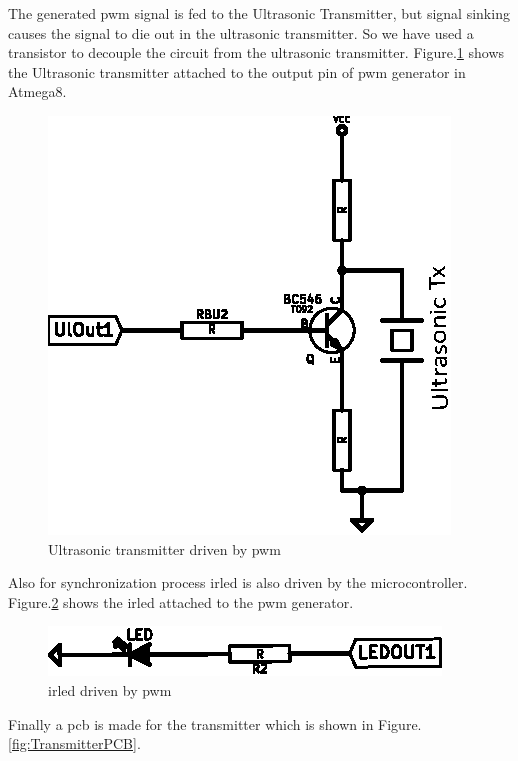 The generated \gls{pwm} signal is fed to the Ultrasonic Transmitter, but signal sinking causes the signal to die out in the ultrasonic transmitter. So we have used a transistor to decouple the circuit from the ultrasonic transmitter. Figure.\ref{fig:Transmitter} shows the Ultrasonic transmitter attached to the output pin of \gls{pwm} generator in Atmega8.
\begin{figure}
	\centering
	\includegraphics{Images/Transmitter.eps}
	\caption{Ultrasonic transmitter driven by \gls{pwm}}
	\label{fig:Transmitter}
\end{figure}

Also for synchronization process \gls{irled} is also driven by the microcontroller. Figure.\ref{fig:IRLEDCircuit} shows the \gls{irled} attached to the \gls{pwm} generator.

\begin{figure}
	\centering
	\includegraphics{Images/IRLEDCircuit.eps}
	\caption{\gls{irled} driven by \gls{pwm}}
	\label{fig:IRLEDCircuit}
\end{figure}

Finally a \gls{pcb} is made for the transmitter which is shown in Figure.\ref{fig:TransmitterPCB}.

